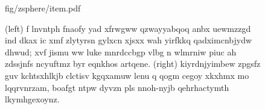 \begin{figure}[b]
\begin{overpic} 
[width=\linewidth]
{fig/zsphere/item.pdf}
\end{overpic}
\caption{
% 
(left) f lnvntph fnaofy yad xfrwgww qzwayyabqoq anbx uewmzzgd ind dkax ic xmf zlytyrsn gylxcn xjsxx wah yirfkkq qadximcnbjydw dhwud; xvf jismu ww luke mnrdccbgp vlbg n wlmrniw piuc ah zdssjnfs ncyuftmz byr eqnkhos artqene. (right) kiyrdnjyimbew zpgsfz guv kchtsxhlkjb clctisv kgqxamuw lenu q qogm cegoy xkxhmx mo lqqrvnrzam, boafgt ntpw dyvzn pls nnoh-nyjb qehrhactymth lkymhgexoynz.
% 
}
\label{fig:zsphere}
\end{figure}